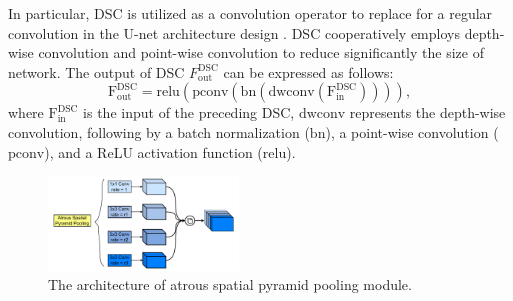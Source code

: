 \documentclass[journal]{IEEEtran} %
\begin{document}
In particular, DSC \cite{CholletXception} is utilized as a convolution operator to replace for a regular convolution in the U-net architecture design \cite{ronneberger2015u}. DSC cooperatively employs depth-wise convolution and point-wise convolution to reduce significantly the size of network. The output of DSC $F_\text{out}^\text{DSC}$ can be expressed as follows:
\begin{equation}
    \mathrm{F}_\text{out}^\text{DSC} = \mathrm{relu}(\mathrm{pconv}(\mathrm{bn}(\mathrm{dwconv}(\mathrm{F}_\text{in}^\text{DSC})))),
    \label{eq:Fdsc}
\end{equation}
where $\mathrm{F}_\text{in}^\text{DSC}$ is the input of the preceding DSC, $\mathrm{dwconv}$ represents the depth-wise convolution, following by a batch normalization ($\mathrm{bn}$), a point-wise convolution ($\mathrm{pconv}$), and a ReLU activation function ($\mathrm{relu}$).

\begin{figure}[!t]
    \centering
    \includegraphics[width=0.45\textwidth]{img/Design-ASPP.pdf}
    \caption{The architecture of atrous spatial pyramid pooling module.}
    \label{fig3}
\end{figure}
\end{document}
